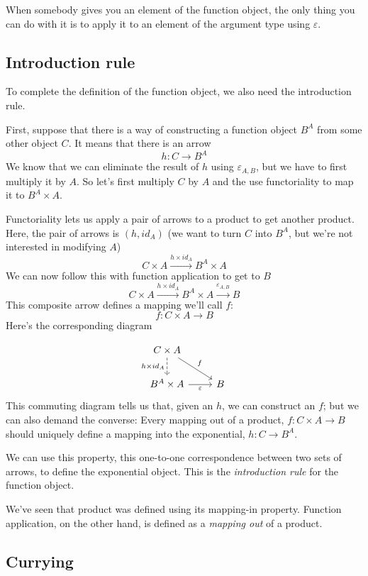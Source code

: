 \documentclass[DaoFP]{subfiles}
\begin{document}
When somebody gives you an element of the function object, the only thing you can do with it is to apply it to an element of the argument type using $\varepsilon$. 

\subsection{Introduction rule}
To complete the definition of the function object, we also need the introduction rule. 

First, suppose that there is a way of constructing a function object $B^A$ from some other object $C$. It means that there is an arrow
\[h \colon C \to B^A\]
We know that we can eliminate the result of $h$ using $\varepsilon_{A, B}$, but we have to first multiply it by $A$. So let's first multiply $C$ by $A$ and the use functoriality to map it to $B^A \times A$. 

Functoriality lets us apply a pair of arrows to a product to get another product. Here, the pair of arrows is $(h, id_A)$ (we want to turn $C$ into $B^A$, but we're not interested in modifying $A$)
\[ C \times A \xrightarrow{h \times id_A} B^A \times A \]
We can now follow this with function application to get to $B$
\[ C \times A \xrightarrow{h \times id_A} B^A \times A \xrightarrow{\varepsilon_{A, B}} B\]
This composite arrow defines a mapping we'll call $f$:
\[f \colon C \times A \to B\]
Here's the corresponding diagram

\[
 \begin{tikzcd}
 C \times A
 \arrow[d, dashed, "h \times id_A"']
 \arrow[rd, "f"]
 \\
 B^A \times A
 \arrow[r, "\varepsilon"']
& B
 \end{tikzcd}
\]
This commuting diagram tells us that, given an $h$, we can construct an $f$; but we can also demand the converse: Every mapping out of a product, $f \colon C \times A \to B$ should uniquely define a mapping into the exponential, $h \colon C \to B^A$. 

We can use this property, this one-to-one correspondence between two sets of arrows, to define the exponential object. This is the \emph{introduction rule} for the function object. 

We've seen that product was defined using its mapping-in property. Function application, on the other hand, is defined as a \emph{mapping out} of a product. 

\subsection{Currying}
\end{document}
